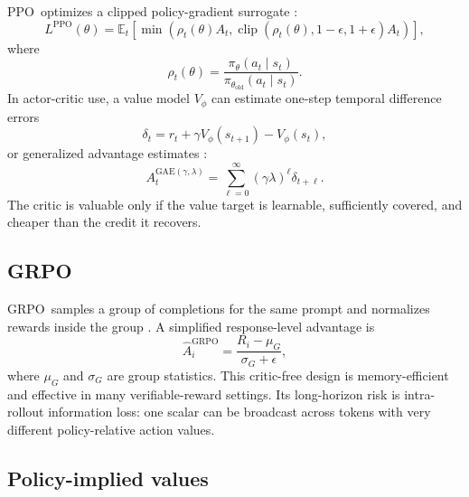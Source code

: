 \documentclass[11pt]{article}
\newcommand{\grpo}{\textsc{GRPO}}
\newcommand{\ppo}{\textsc{PPO}}
\newcommand{\GRPOm}{\mathrm{GRPO}}
\newcommand{\PPOm}{\mathrm{PPO}}
\newcommand{\E}{\mathbb{E}}
\newcommand{\Ahat}{\widehat{A}}
\begin{document}
\ppo\ optimizes a clipped policy-gradient surrogate \citep{schulman2017ppo}:
\begin{equation}
L^{\PPOm}(\theta) =
\E_t \left[
  \min\left(
    \rho_t(\theta) A_t,
    \operatorname{clip}(\rho_t(\theta),1-\epsilon,1+\epsilon) A_t
  \right)
\right],
\end{equation}
where
\begin{equation}
  \rho_t(\theta) =
  \frac{\pi_\theta(a_t \mid s_t)}
       {\pi_{\theta_{\mathrm{old}}}(a_t \mid s_t)}.
\end{equation}
In actor-critic use, a value model $V_\phi$ can estimate one-step temporal
difference errors
\begin{equation}
  \delta_t = r_t + \gamma V_\phi(s_{t+1}) - V_\phi(s_t),
\end{equation}
or generalized advantage estimates \citep{schulman2015gae}:
\begin{equation}
  A_t^{\mathrm{GAE}(\gamma,\lambda)}
  = \sum_{\ell=0}^{\infty}(\gamma\lambda)^\ell \delta_{t+\ell}
  .
\end{equation}
The critic is valuable only if the value target is learnable, sufficiently
covered, and cheaper than the credit it recovers.

\subsection{GRPO}

\grpo\ samples a group of completions for the same prompt and normalizes rewards
inside the group \citep{shao2024deepseekmath,deepseek2025r1}. A simplified
response-level advantage is
\begin{equation}
  \Ahat_i^{\GRPOm} =
  \frac{R_i - \mu_G}{\sigma_G+\epsilon},
\end{equation}
where $\mu_G$ and $\sigma_G$ are group statistics. This critic-free design is
memory-efficient and effective in many verifiable-reward settings. Its
long-horizon risk is intra-rollout information loss: one scalar can be
broadcast across tokens with very different policy-relative action values.

\subsection{Policy-implied values}
\end{document}
